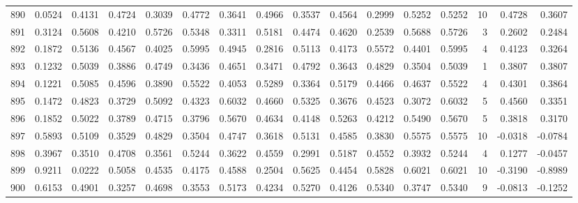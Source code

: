 \begin{tabular}{lrrrrrrrrrrrrrrr}
890 &      0.0524 &  0.4131 &  0.4724 &  0.3039 &  0.4772 &  0.3641 &  0.4966 &  0.3537 &  0.4564 &  0.2999 &   0.5252 &     0.5252 &     10 &                    0.4728 &                     0.3607 \\
891 &      0.3124 &  0.5608 &  0.4210 &  0.5726 &  0.5348 &  0.3311 &  0.5181 &  0.4474 &  0.4620 &  0.2539 &   0.5688 &     0.5726 &      3 &                    0.2602 &                     0.2484 \\
892 &      0.1872 &  0.5136 &  0.4567 &  0.4025 &  0.5995 &  0.4945 &  0.2816 &  0.5113 &  0.4173 &  0.5572 &   0.4401 &     0.5995 &      4 &                    0.4123 &                     0.3264 \\
893 &      0.1232 &  0.5039 &  0.3886 &  0.4749 &  0.3436 &  0.4651 &  0.3471 &  0.4792 &  0.3643 &  0.4829 &   0.3504 &     0.5039 &      1 &                    0.3807 &                     0.3807 \\
894 &      0.1221 &  0.5085 &  0.4596 &  0.3890 &  0.5522 &  0.4053 &  0.5289 &  0.3364 &  0.5179 &  0.4466 &   0.4637 &     0.5522 &      4 &                    0.4301 &                     0.3864 \\
895 &      0.1472 &  0.4823 &  0.3729 &  0.5092 &  0.4323 &  0.6032 &  0.4660 &  0.5325 &  0.3676 &  0.4523 &   0.3072 &     0.6032 &      5 &                    0.4560 &                     0.3351 \\
896 &      0.1852 &  0.5022 &  0.3789 &  0.4715 &  0.3796 &  0.5670 &  0.4634 &  0.4148 &  0.5263 &  0.4212 &   0.5490 &     0.5670 &      5 &                    0.3818 &                     0.3170 \\
897 &      0.5893 &  0.5109 &  0.3529 &  0.4829 &  0.3504 &  0.4747 &  0.3618 &  0.5131 &  0.4585 &  0.3830 &   0.5575 &     0.5575 &     10 &                   -0.0318 &                    -0.0784 \\
898 &      0.3967 &  0.3510 &  0.4708 &  0.3561 &  0.5244 &  0.3622 &  0.4559 &  0.2991 &  0.5187 &  0.4552 &   0.3932 &     0.5244 &      4 &                    0.1277 &                    -0.0457 \\
899 &      0.9211 &  0.0222 &  0.5058 &  0.4535 &  0.4175 &  0.4588 &  0.2504 &  0.5625 &  0.4454 &  0.5828 &   0.6021 &     0.6021 &     10 &                   -0.3190 &                    -0.8989 \\
900 &      0.6153 &  0.4901 &  0.3257 &  0.4698 &  0.3553 &  0.5173 &  0.4234 &  0.5270 &  0.4126 &  0.5340 &   0.3747 &     0.5340 &      9 &                   -0.0813 &                    -0.1252 \\

\end{tabular}
